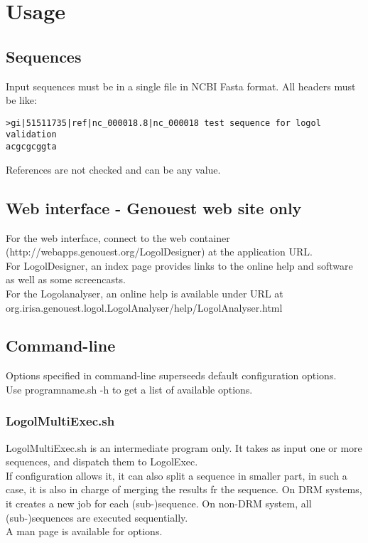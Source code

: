 \documentclass[11pt]{article}
\begin{document}
\section{Usage}

\subsection{Sequences}

Input sequences must be in a single  file in NCBI Fasta format. All headers must be like:\\
\small{
\begin{verbatim}
>gi|51511735|ref|nc_000018.8|nc_000018 test sequence for logol validation
acgcgcggta
 \end{verbatim}
}

References are not checked and can be any value.

\subsection{Web interface - Genouest web site only}

For the web interface, connect to the web container (http://webapps.genouest.org/LogolDesigner) at the application URL.\\
For LogolDesigner, an index page provides links to the online help and software as well as some screencasts.\\
For the Logolanalyser, an online help is available under URL at org.irisa.genouest.logol.LogolAnalyser/help/LogolAnalyser.html

\subsection{Command-line}

 Options specified in command-line superseeds default configuration options.\\
 Use programname.sh -h to get a list of available options.

\subsubsection{LogolMultiExec.sh}

LogolMultiExec.sh is an intermediate program only. It takes as input one or more sequences, and dispatch them to LogolExec.\\
If configuration allows it, it can also split a sequence in smaller part, in such a case, it is also in charge of merging the results fr the sequence. On DRM systems, it creates a new job for each (sub-)sequence. On non-DRM system, all (sub-)sequences are executed sequentially.\\
 A man page is available for options.
\end{document}
